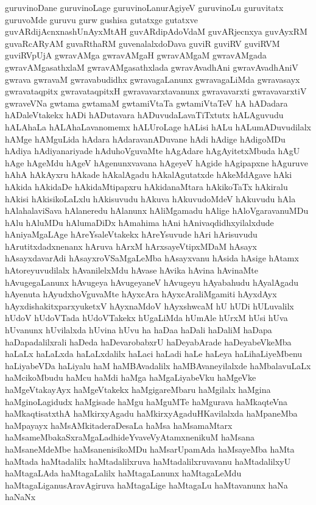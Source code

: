 {guruvinoDane
guruvinoLage
guruvinoLanurAgiyeV
guruvinoLu
guruvitatx
guruvoMde
guruvu
gurw
gushisa
gutatxge
gutatxve
guvARdijAcnxnashUnAyxMtAH
guvARdipAdoVdaM
guvARjecnxya
guvAyxRM
guvaRcARyAM
guvaRthaRM
guvenalalxdoDava
guviR
guviRV
guviRVM
guviRVpUjA
gwravAMga
gwravAMgaH
gwravAMgaM
gwravAMgada
gwravAMgasathxlaM
gwravAMgasathxlada
gwravAvadhAni
gwravAvadhAniV
gwrava
gwravaM
gwravabudidhx
gwravagaLanunx
gwravagaLiMda
gwravasayx
gwravataqpitx
gwravataqpitxH
gwravavarxtavanunx
gwravavarxti
gwravavarxtiV
gwraveVNa
gwtama
gwtamaM
gwtamiVtaTa
gwtamiVtaTeV
hA
hADadara
hADaleVtakekx
hADi
hADutavara
hADuvudaLavaTiTxtutx
hALAguvudu
hALAhaLa
hALAhaLavanomemx
hALUroLage
hALisi
hALu
hALumADuvudilalx
hAMge
hAMguLida
hAdara
hAdaravanADuvane
hAdi
hAdige
hAdigoMDu
hAdiya
hAdiyanariyade
hAduhoVguvaMte
hAgAdare
hAgAyitetxMbuda
hAgU
hAge
hAgeMdu
hAgeV
hAgenunxvavana
hAgeyeV
hAgide
hAgipapxne
hAguruve
hAhA
hAkAyxru
hAkade
hAkalAgadu
hAkalAgutatxde
hAkeMdAgave
hAki
hAkida
hAkidaDe
hAkidaMtipapxru
hAkidanaMtara
hAkikoTaTx
hAkiralu
hAkisi
hAkisikoLaLxlu
hAkisuvudu
hAkuva
hAkuvudoMdeV
hAkuvudu
hAla
hAlahalaviSava
hAlaneredu
hAlanunx
hAliMgamadu
hAlige
hAloVgaravanuMDu
hAlu
hAluMDu
hAlumaDiDx
hAmahima
hAni
hAnivaqdidhxyilalxdude
hAniyaMgaLAge
hAreYsaleVtakekx
hAreYsuvude
hAri
hArisuvudu
hArutitxdadxnenanx
hAruva
hArxM
hArxsayeVtipxMDaM
hAsayx
hAsayxdavarAdi
hAsayxroVSaMgaLeMba
hAsayxvanu
hAsida
hAsige
hAtamx
hAtoreyuvudilalx
hAvanilelxMdu
hAvase
hAvika
hAvina
hAvinaMte
hAvugegaLanunx
hAvugeya
hAvugeyaneV
hAvugeyu
hAyabahudu
hAyalAgadu
hAyenuta
hAyudxhoVguvaMte
hAyxcAra
hAyxcAraliMgamiti
hAyxdAyx
hAyxdishakitxparxyuketxV
hAyxnaMdoV
hAyxshwcaM
hU
hUDi
hULuvalilx
hUdoV
hUdoVTada
hUdoVTakekx
hUgaLiMda
hUmAle
hUrxM
hUsi
hUva
hUvanunx
hUvilalxda
hUvina
hUvu
ha
haDaa
haDali
haDaliM
haDapa
haDapadalilxrali
haDeda
haDevarobabxrU
haDeyabArade
haDeyabeVkeMba
haLaLx
haLaLxda
haLaLxdalilx
haLaci
haLadi
haLe
haLeya
haLihaLiyeMbenu
haLiyabeVDa
haLiyalu
haM
haMBAvadalilx
haMBAvaneyilalxde
haMbalavuLaLx
haMcikoMbudu
haMcu
haMdi
haMga
haMgaLiyabeVku
haMgeVke
haMgeVtakayAyx
haMgeVtakekx
haMgigareMbaru
haMgilalx
haMgina
haMginoLagidudx
haMgisade
haMgu
haMguMTe
haMgurava
haMkaqteVna
haMkaqtisatxthA
haMkirxyAgadu
haMkirxyAgaduHKavilalxda
haMpaneMba
haMpayayx
haMsAMkitaderaDesaLa
haMsa
haMsamaMtarx
haMsameMbakaSxraMgaLadhideYvaveVyAtamxnenikuM
haMsana
haMsaneMdeMbe
haMsanenisikoMDu
haMsarUpamAda
haMsayeMba
haMta
haMtada
haMtadalilx
haMtadalilxruva
haMtadalilxruvavanu
haMtadalilxyU
haMtagaLAda
haMtagaLalilx
haMtagaLanunx
haMtagaLeMdu
haMtagaLiganusAravAgiruva
haMtagaLige
haMtagaLu
haMtavanunx
haNa
haNaNx
}
